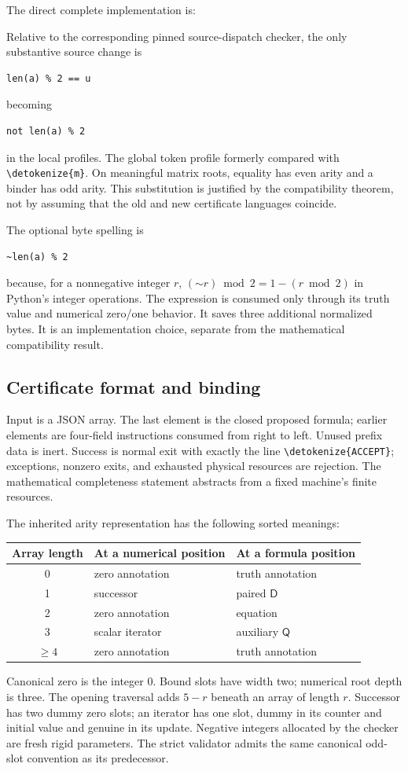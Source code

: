 \documentclass[11pt,letterpaper]{article}
\theoremstyle{definition}\newtheorem{definition}[theorem]{Definition}
\theoremstyle{remark}\newtheorem{remark}[theorem]{Remark}
\newcommand{\D}{\mathsf D}
\newcommand{\Q}{\mathsf Q}
\newcommand{\file}[1]{\expandafter\nolinkurl\expandafter{\detokenize{#1}}}
\begin{document}
The direct complete implementation is:


Relative to the corresponding pinned source-dispatch checker, the only
substantive source change is
\begin{lstlisting}
len(a) % 2 == u
\end{lstlisting}
becoming
\begin{lstlisting}
not len(a) % 2
\end{lstlisting}
in the local profiles. The global token profile formerly compared with
\file{m}. On meaningful matrix roots, equality has even arity and a binder
has odd arity. This substitution is justified by the compatibility theorem,
not by assuming that the old and new certificate languages coincide.

The optional byte spelling is
\begin{lstlisting}
~len(a) % 2
\end{lstlisting}
because, for a nonnegative integer $r$,
$(\mathord\sim r)\bmod2=1-(r\bmod2)$ in Python's integer operations.
The expression is consumed only through its truth value and numerical
zero/one behavior. It saves three additional normalized bytes. It is an
implementation choice, separate from the mathematical compatibility result.

\subsection{Certificate format and binding}

Input is a JSON array. The last element is the closed proposed formula;
earlier elements are four-field instructions consumed from right to left.
Unused prefix data is inert. Success is normal exit with exactly the line
\file{ACCEPT}; exceptions, nonzero exits, and exhausted physical resources
are rejection. The mathematical completeness statement abstracts from a
fixed machine's finite resources.

The inherited arity representation has the following sorted meanings:
\begin{center}\small
\begin{tabular}{cll}
\toprule
Array length & At a numerical position & At a formula position\\
\midrule
0 & zero annotation & truth annotation\\
1 & successor & paired $\D$\\
2 & zero annotation & equation\\
3 & scalar iterator & auxiliary $\Q$\\
$\geq4$ & zero annotation & truth annotation\\
\bottomrule
\end{tabular}
\end{center}
Canonical zero is the integer $0$. Bound slots have width two; numerical
root depth is three. The opening traversal adds $5-r$ beneath an array of
length $r$. Successor has two dummy zero slots; an iterator has one slot,
dummy in its counter and initial value and genuine in its update. Negative
integers allocated by the checker are fresh rigid parameters. The strict
validator admits the same canonical odd-slot convention as its predecessor.
\end{document}
